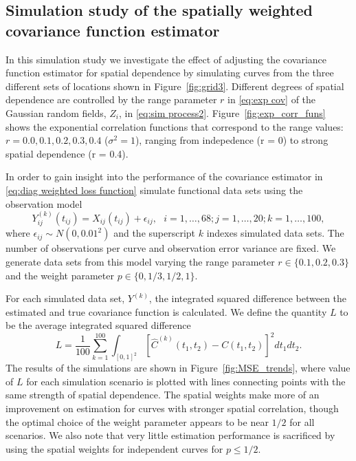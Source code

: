 \subsection{Simulation study of the spatially weighted covariance function estimator} %
\label{sub:simulation covariance}

In this simulation study we investigate the effect of adjusting the covariance function estimator for spatial dependence by simulating curves from the three different sets of locations shown in Figure~\ref{fig:grid3}. Different degrees of spatial dependence are controlled by the range parameter $r$ in \eqref{eq:exp cov} of the Gaussian random fields, $Z_i$, in \eqref{eq:sim process2}. Figure~\ref{fig:exp_corr_funs} shows the exponential correlation functions that correspond to the range values: $r = 0.0, 0.1, 0.2, 0.3, 0.4$ ($\sigma^2=1$), ranging from indepedence (r = 0) to strong spatial dependence (r = 0.4).

In order to gain insight into the performance of the covariance estimator in \eqref{eq:diag weighted loss function} simulate functional data sets using the observation model 
\begin{equation}
	Y^{(k)}_{ij}(t_{ij}) = X_{ij}(t_{ij}) + \epsilon_{ij}, \mbox{ } i = 1, \dots, 68; j = 1, \dots, 20; k = 1, \dots, 100,
\end{equation}
where $\epsilon_{ij} \sim N(0, 0.01^2)$ and the superscript $k$ indexes simulated data sets. The number of observations per curve and observation error variance are fixed. We generate data sets from this model varying the range parameter $r \in \{0.1, 0.2, 0.3\}$ and the weight parameter $p \in \{0, 1/3, 1/2, 1\}$. 

For each simulated data set, $Y^{(k)}$, the integrated squared difference between the estimated and true covariance function is calculated. We define the quantity $L$ to be the average integrated squared difference
\begin{equation}
	L = \frac{1}{100}\sum_{k=1}^{100}\int_{[0,1]^2} [\hat{C}^{(k)}(t_1, t_2) - C(t_1,t_2)]^2dt_1dt_2.
\end{equation}
The results of the simulations are shown in Figure~\ref{fig:MSE_trends}, where value of $L$ for each simulation scenario is plotted with lines connecting points with the same strength of spatial dependence. The spatial weights make more of an improvement on estimation for curves with stronger spatial correlation, though the optimal choice of the weight parameter appears to be near $1/2$ for all scenarios. We also note that very little estimation performance is sacrificed by using the spatial weights for independent curves for $p \leq 1/2$.

